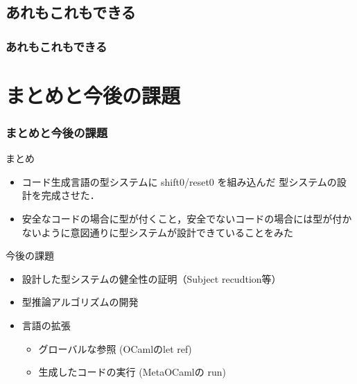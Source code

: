 \subsection{あれもこれもできる}

\begin{frame}
  \frametitle{あれもこれもできる}

\end{frame}

\section{まとめと今後の課題}

\begin{frame}
  \frametitle{まとめと今後の課題}
  まとめ
  \begin{itemize}
  \item コード生成言語の型システムに shift0/reset0 を組み込んだ 型システムの設計を完成させた．
  \item 安全なコードの場合に型が付くこと，安全でないコードの場合には型が付かないように意図通りに型システムが設計できていることをみた
  \end{itemize}

  \vspace{\baselineskip}

  今後の課題
  \begin{itemize}
  \item 設計した型システムの健全性の証明（Subject recudtion等）
  \item 型推論アルゴリズムの開発
  \item 言語の拡張
    \begin{itemize}
    \item グローバルな参照 (OCamlのlet ref)
    \item 生成したコードの実行 (MetaOCamlの run)
    \end{itemize}
  \end{itemize}
\end{frame}

